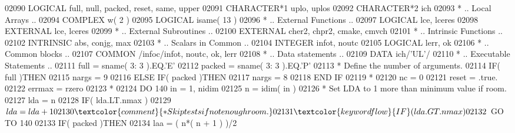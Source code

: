 \begin{DoxyCode}
02090       \textcolor{keywordtype}{LOGICAL}            full, null, packed, reset, same, upper
02091       \textcolor{keywordtype}{CHARACTER*1}        uplo, uplos
02092       \textcolor{keywordtype}{CHARACTER*2}        ich
02093 \textcolor{comment}{*     .. Local Arrays ..}
02094       \textcolor{keywordtype}{COMPLEX}            w( 2 )
02095       \textcolor{keywordtype}{LOGICAL}            isame( 13 )
02096 \textcolor{comment}{*     .. External Functions ..}
02097       \textcolor{keywordtype}{LOGICAL}            lce, lceres
02098       \textcolor{keywordtype}{EXTERNAL}           lce, lceres
02099 \textcolor{comment}{*     .. External Subroutines ..}
02100       \textcolor{keywordtype}{EXTERNAL}           cher2, chpr2, cmake, cmvch
02101 \textcolor{comment}{*     .. Intrinsic Functions ..}
02102       \textcolor{keywordtype}{INTRINSIC}          abs, conjg, max
02103 \textcolor{comment}{*     .. Scalars in Common ..}
02104       \textcolor{keywordtype}{INTEGER}            infot, noutc
02105       \textcolor{keywordtype}{LOGICAL}            lerr, ok
02106 \textcolor{comment}{*     .. Common blocks ..}
02107       \textcolor{keyword}{COMMON}             /infoc/infot, noutc, ok, lerr
02108 \textcolor{comment}{*     .. Data statements ..}
02109       \textcolor{keyword}{DATA}               ich/\textcolor{stringliteral}{'UL'}/
02110 \textcolor{comment}{*     .. Executable Statements ..}
02111       full = sname( 3: 3 ).EQ.\textcolor{stringliteral}{'E'}
02112       packed = sname( 3: 3 ).EQ.\textcolor{stringliteral}{'P'}
02113 \textcolor{comment}{*     Define the number of arguments.}
02114       \textcolor{keywordflow}{IF}( full )\textcolor{keywordflow}{THEN}
02115          nargs = 9
02116       \textcolor{keywordflow}{ELSE} \textcolor{keywordflow}{IF}( packed )\textcolor{keywordflow}{THEN}
02117          nargs = 8
02118 \textcolor{keywordflow}{      END IF}
02119 \textcolor{comment}{*}
02120       nc = 0
02121       reset = .true.
02122       errmax = rzero
02123 \textcolor{comment}{*}
02124       \textcolor{keywordflow}{DO} 140 in = 1, nidim
02125          n = idim( in )
02126 \textcolor{comment}{*        Set LDA to 1 more than minimum value if room.}
02127          lda = n
02128          \textcolor{keywordflow}{IF}( lda.LT.nmax )
02129      $      lda = lda + 1
02130 \textcolor{comment}{*        Skip tests if not enough room.}
02131          \textcolor{keywordflow}{IF}( lda.GT.nmax )
02132      $      \textcolor{keywordflow}{GO TO} 140
02133          \textcolor{keywordflow}{IF}( packed )\textcolor{keywordflow}{THEN}
02134             laa = ( n*( n + 1 ) )/2

\end{DoxyCode}
